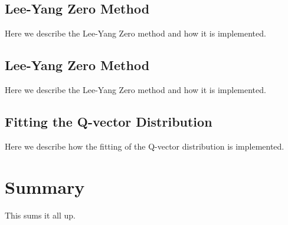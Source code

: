 \documentclass[a5paper]{book}
\numberwithin{equation}{subsection}
\begin{document}
	\section{Lee-Yang Zero Method}
	\label{LYZ}
	Here we describe the Lee-Yang Zero method and how it is implemented.
		
	\section{Lee-Yang Zero Method}
	\label{LYZ}
	Here we describe the Lee-Yang Zero method and how it is implemented.
		
	\section{Fitting the Q-vector Distribution}
	\label{qfit}
	Here we describe how the fitting of the Q-vector distribution is implemented.
		
	\chapter{Summary}
	\label{Summary}
	This sums it all up.
		
\end{document}
